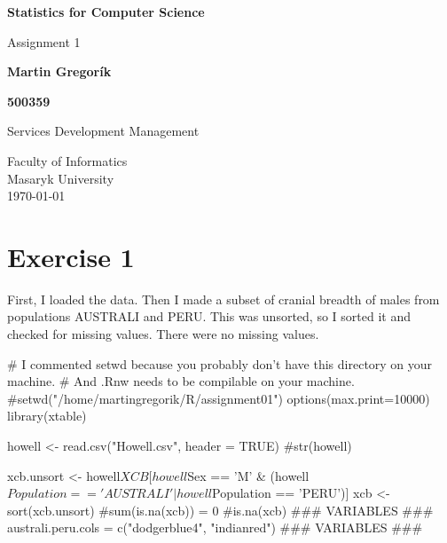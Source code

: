 \documentclass[12pt, oneside]{report}\usepackage[]{graphicx}\usepackage[]{color}
\begin{document}
\begin{titlepage}
    \begin{center}
        \vspace*{1cm}
        
        \Huge
          \textbf{Statistics for Computer Science} %
        
        \vspace{0.5cm}
        \LARGE
        Assignment 1 %
        
        \vspace{1.5cm}
        
        \textbf{Martin Gregorík} %
   		  \vspace{1.5cm}
        
        \textbf{500359} %
       
        \vfill
        
        Services Development Management %
        
        \vspace{0.8cm}
          \Large
        Faculty of Informatics\\
        Masaryk University\\
        \vspace{0.5cm}
       \today
        
    \end{center}
\end{titlepage}


\section*{Exercise 1}

First, I loaded the data. Then I made a subset of cranial breadth of males from populations AUSTRALI and PERU. This was unsorted, so I sorted it and checked for missing values. There were no missing values.

\begin{Schunk}
\begin{Sinput}
# I commented setwd because you probably don't have this directory on your machine.
# And .Rnw needs to be compilable on your machine.
#setwd("/home/martingregorik/R/assignment01")
options(max.print=10000)
library(xtable)

howell <- read.csv("Howell.csv", header = TRUE)
#str(howell)

xcb.unsort <- howell$XCB[howell$Sex == 'M' & (howell$Population == 'AUSTRALI' | howell$Population == 'PERU')]
xcb <- sort(xcb.unsort)
#sum(is.na(xcb)) = 0
#is.na(xcb)
### VARIABLES ###
australi.peru.cols = c("dodgerblue4", "indianred")
### VARIABLES ###
\end{Sinput}
\end{Schunk}
\end{document}
